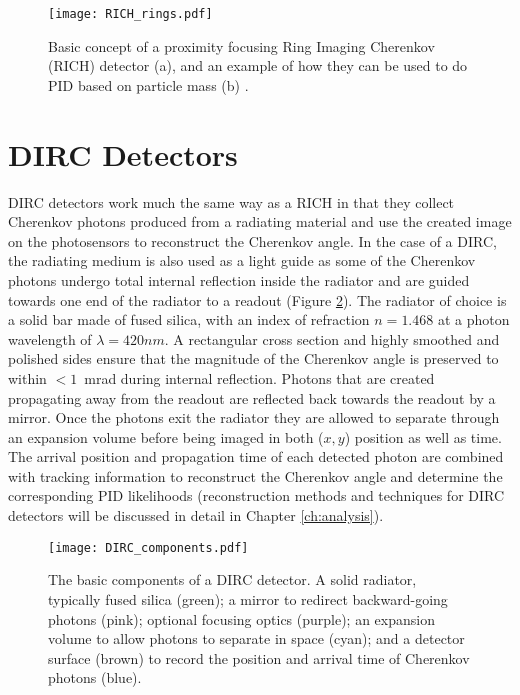 \begin{figure}[!htb]
	\centering
	\texttt{[image: RICH\_rings.pdf]}
	\caption[Basic concept of a proximity focusing Ring Imaging Cherenkov (RICH) detector (a), and an example of how they can be used to do PID based on particle mass (b).]{Basic concept of a proximity focusing Ring Imaging Cherenkov (RICH) detector (a), and an example of how they can be used to do PID based on particle mass (b) \cite{GregThesis}.}
	\label{fig:rich_basics}
\end{figure}


\section{DIRC Detectors}
DIRC detectors work much the same way as a RICH in that they collect Cherenkov photons produced from a radiating material and use the created image on the photosensors to reconstruct the Cherenkov angle. In the case of a DIRC, the radiating medium is also used as a light guide as some of the Cherenkov photons undergo total internal reflection inside the radiator and are guided towards one end of the radiator to a readout (Figure \ref{fig:dircbasics}). The radiator of choice is a solid bar made of fused silica, with an index of refraction $n = 1.468$ at a photon wavelength of $\lambda = 420\unit{nm}$. A rectangular cross section and highly smoothed and polished sides ensure that the magnitude of the Cherenkov angle is preserved to within $<1$~mrad during internal reflection. Photons that are created propagating away from the readout are reflected back towards the readout by a mirror. Once the photons exit the radiator they are allowed to separate through an expansion volume before being imaged in both ($x, y$) position as well as time. The arrival position and propagation time of each detected photon are combined with tracking information to reconstruct the Cherenkov angle and determine the corresponding PID likelihoods (reconstruction methods and techniques for DIRC detectors will be discussed in detail in Chapter \ref{ch:analysis}).

\begin{figure}[!htb]
	\centering
	\texttt{[image: DIRC\_components.pdf]}
	\caption[The basic components of a DIRC detector.]{The basic components of a DIRC detector. A solid radiator, typically fused silica (green); a mirror to redirect backward-going photons (pink); optional focusing optics (purple); an expansion volume to allow photons to separate in space (cyan); and a detector surface (brown) to record the position and arrival time of Cherenkov photons (blue).}
	\label{fig:dircbasics}
\end{figure}

